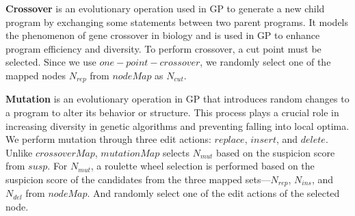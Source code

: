 \documentclass[10pt,conference]{IEEEtran}
\begin{document}
        \textbf{Crossover}\label{crossover} is an evolutionary operation used in GP to generate a new child program by exchanging some statements between two parent programs. It models the phenomenon of gene crossover in biology and is used in GP to enhance program efficiency and diversity. To perform crossover, a cut point must be selected. Since we use $one-point-crossover$, we randomly select one of the mapped nodes $N_{rep}$ from $nodeMap$ as $N_{cut}$.

        \textbf{Mutation}\label{mutation} is an evolutionary operation in GP that introduces random changes to a program to alter its behavior or structure. This process plays a crucial role in increasing diversity in genetic algorithms and preventing falling into local optima. We perform mutation through three edit actions: $replace$, $insert$, and $delete$. Unlike $crossoverMap$, $mutationMap$ selects $N_{mut}$ based on the suspicion score from $susp$. For $N_{mut}$, a roulette wheel selection \cite{eiben2015introduction} is performed based on the suspicion score of the candidates from the three mapped sets—$N_{rep}$, $N_{ins}$, and $N_{del}$ from $nodeMap$. And randomly select one of the edit actions of the selected node.
        
\end{document}
